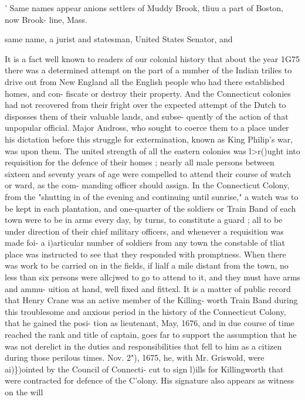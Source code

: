 \documentclass[oneside]{book}
\begin{document}
' Same names appear anions settlers of Muddy Brook, tliuu a part of Boston, now Brook- 
line, Mass. 




same name, a jurist and statesman, United States Senator, and 

It is a fact well known to readers of our colonial history that 
about the year 1G75 there was a determined attempt on the part 
of a number of the Indian trilies to drive out from New England 
all the English people who had there established homes, and con- 
fiscate or destroy their property. And the Connecticut colonies 
had not recovered from their fright over the expected attempt of 
the Dutch to disposses them of their valuable lands, and subse- 
quently of the action of that unpopular official. Major Andross, 
who sought to coerce them to a place under his dictation before 
this struggle for extermination, known as King Philip's war, was 
upon them. The united strength of all the eastern colonies was 
l>r()ught into requisition for the defence of their homes ; nearly 
all male persons between sixteen and seventy years of age were 
compelled to attend their course of watch or ward, as the com- 
manding officer should assign. In the Connecticut Colony, from 
the "shutting in of the evening and continuing until sunrise," a 
watch was to be kept in each plantation, and one-quarter of the 
soldiers or Train Band of each town were to be in arms every 
day, by turns, to constitute a guard ; all to be under direction of 
their chief military officers, and whenever a requisition was made 
foi- a i)articular number of soldiers from any town the constable 
of tliat place was instructed to see that they responded with 
promptness. When there was work to be carried on in the fields, 
if lialf a mile distant from the town, no less than six persons were 
allcjwed to go to attend to it, and they must have arms and ammu- 
uition at hand, well fixed and fittexl. It is a matter of public 
record that Henry Crane was an active member of the Killing- 
worth Train Band during this troublesome and anxious period in 
the history of the Connecticut Colony, that he gained the posi- 
tion as lieutenant, May, 1676, and in due course of time reached 
the rank and title of captain, goes far to support the assumption 
that he was not derelict in the duties and responsibilities that fell 
to him as a citizen during those perilous times. Nov. 2"), 1675, 
he, with Mr. Griswold, were ai)\})ointed by the Council of Connecti- 
cut to sign l)ills for Killingworth that were contracted for defence 
of the C'olony. His signature also appears as witness on the will 
\end{document}
